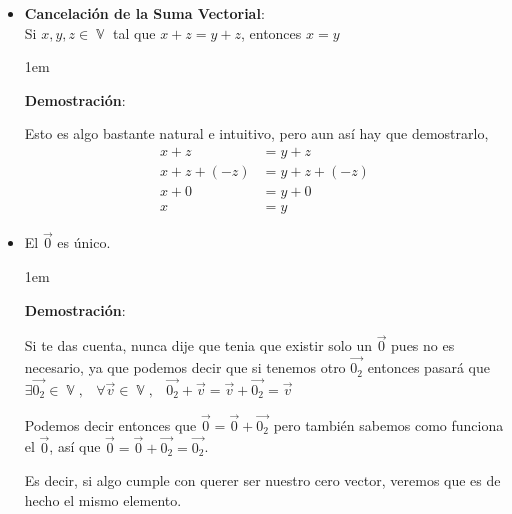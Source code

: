 \documentclass[12pt, fleqn]{report}                             %
\newenvironment{SmallIndentation}[1][0.75em]                    %
        {\begin{adjustwidth}{#1}{}\begin{footnotesize}}             %
        {\end{footnotesize}\end{adjustwidth}}                       %
\DeclareMathOperator \Space     {\quad}                         %
\DeclareMathOperator \MiniSpace {\;}                            %
\theoremstyle{break}                                            %
\DeclareMathOperator \VectorSet    {\mathbb{V}}                 %
\begin{document}
            \begin{itemize}

                \item \textbf{Cancelación de la Suma Vectorial}:\\
                    Si $x, y, z \in \VectorSet$ tal que $x + z = y + z$, entonces $x = y$

                    \begin{SmallIndentation}[1em]
                        \textbf{Demostración}:

                        Esto es algo bastante natural e intuitivo, pero aun así hay que demostrarlo, 
                        \begin{align*}
                            x + z &= y + z                  \\
                            x + z + (-z) &= y + z + (-z)    \\
                            x + 0 &= y + 0                  \\
                            x &= y                          
                        \end{align*}

                    \end{SmallIndentation}


                \item El $\vec{0}$ es único.

                    \begin{SmallIndentation}[1em]
                        \textbf{Demostración}:

                        Si te das cuenta, nunca dije que tenia que existir solo un $\vec{0}$ pues no es
                        necesario, ya que podemos decir que si tenemos otro $\vec{0_2}$ entonces pasará que 
                        $\exists \vec{0_2} \in \VectorSet, \MiniSpace
                            \forall \vec{v} \in \VectorSet, \MiniSpace
                                \vec{0_2} + \vec{v} = \vec{v} + \vec{0_2} = \vec{v}$

                        Podemos decir entonces que $\vec{0} = \vec{0}+\vec{0_2}$ pero también sabemos como
                        funciona el $\vec{0}$, así que $\vec{0} = \vec{0}+\vec{0_2} = \vec{0_2}$.

                        Es decir, si algo cumple con querer ser nuestro cero vector, veremos que es de hecho
                        el mismo elemento.


\end{SmallIndentation}
\end{itemize}
\end{document}

